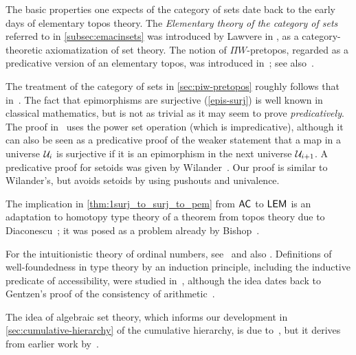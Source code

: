 %

\sectionNotes

The basic properties one expects of the category of sets date back to the early days of elementary topos theory.
The \emph{Elementary theory of the category of sets} referred to in \cref{subsec:emacinsets} was introduced by Lawvere in
\cite{lawvere:etcs-long}, as a category-theoretic axiomatization of set theory.
%
The notion of $\Pi W$-pretopos, regarded as a predicative version of an elementary topos, was introduced in~\cite{MoerdijkPalmgren2002}; see also~\cite{palmgren:cetcs}.

The treatment of the category of sets in \cref{sec:piw-pretopos} roughly follows that in~\cite{RijkeSpitters}.
The fact that epimorphisms are surjective (\cref{epis-surj}) is well known in classical mathematics, but is not as trivial as it may seem to prove \emph{predicatively}.
%
The proof in~\cite{Mines/R/R:1988} uses the power set operation (which is impredicative), although it can also be seen as a predicative proof of the weaker statement that a map in a universe $\mathcal{U}_i$ is surjective if it is an epimorphism in the next universe $\mathcal{U}_{i+1}$.
A predicative proof for setoids was given by Wilander~\cite{Wilander2010}.
Our proof is similar to Wilander's, but avoids setoids by using pushouts and univalence.

The implication in \cref{thm:1surj_to_surj_to_pem} from $\mathsf{AC}_{}$ to $\mathsf{LEM}_{}$ is an adaptation to homotopy type
theory of a theorem from topos theory due to Diaconescu~\cite{Diaconescu}; it was posed as a problem already by Bishop~\cite[Problem~2]{Bishop1967}.

For the intuitionistic theory of ordinal numbers, see~\cite{taylor:ordinals,Taylor99} and also \cite{JoyalMoerdijk1995}.
Definitions of well-foundedness in type theory by an induction principle, including the inductive predicate of accessibility, were studied in~\cite{Huet80,Paulson86,Nordstrom88}, although the idea dates back to Gentzen's proof of the consistency of arithmetic~\cite{Gentzen36}.

The idea of algebraic set theory, which informs our development in \cref{sec:cumulative-hierarchy} of the cumulative hierarchy, is due to~\cite{JoyalMoerdijk1995}, but it derives from earlier work by~\cite{AczelCZF}.
%
%


